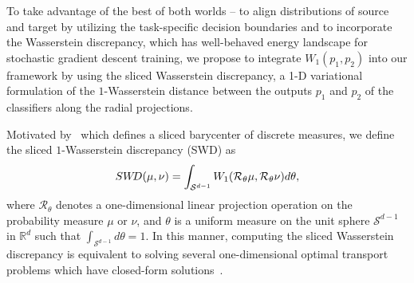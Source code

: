 \documentclass[10pt,twocolumn,letterpaper]{article}
\begin{document}
To take advantage of the best of both worlds -- to align distributions of source and target by utilizing the task-specific decision boundaries and to incorporate the Wasserstein discrepancy, which has well-behaved energy landscape for stochastic gradient descent training, we propose to integrate $W_1(p_1, p_2)$ into our framework by using the sliced Wasserstein discrepancy, a 1-D variational formulation of the $1$-Wasserstein distance between the outputs $p_1$ and $p_2$ of the classifiers along the radial projections. 

Motivated by~\cite{rabin2011wasserstein} which defines a sliced barycenter of discrete measures, we define the sliced $1$-Wasserstein discrepancy (SWD) as
\begin{equation}
\small
SW\hspace{-0.7mm}D (\mu, \nu) = \int_{\mathcal{S}^{d-1}} W_1( {\mathcal{R}_\theta} \mu, {\mathcal{R}_\theta} \nu) d\theta,
\end{equation}
where ${\mathcal{R}_\theta}$ denotes a one-dimensional linear projection operation on the probability measure $\mu$ or $\nu$, and $\theta$ is a uniform measure on the unit sphere $\mathcal{S}^{d-1}$ in $\mathbb{R}^d$ such that $\int_{\mathcal{S}^{d-1}} d \theta = 1$. In this manner, computing the sliced Wasserstein discrepancy is equivalent to solving several one-dimensional optimal transport problems which have closed-form solutions~\cite{rabin2011wasserstein}.
\end{document}
